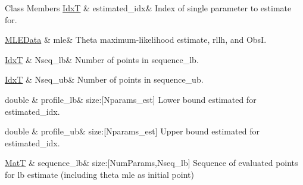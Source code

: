 \begin{DoxyFields}{Class Members}
\hyperlink{namespacemappel_ab17ec0f30b61ece292439d7ece81d3a8}{IdxT}\hypertarget{namespacemappel_1_1estimator_aae656c5dcf7ceedd1a35dcb0163446c0}{}\label{namespacemappel_1_1estimator_aae656c5dcf7ceedd1a35dcb0163446c0}
&
estimated\+\_\+idx&
Index of single parameter to estimate for. \\
\hline

\hyperlink{namespacemappel_1_1estimator_structmappel_1_1estimator_1_1MLEData}{M\+L\+E\+Data}\hypertarget{namespacemappel_1_1estimator_a78f5375e6d29abb17573d1089af37b41}{}\label{namespacemappel_1_1estimator_a78f5375e6d29abb17573d1089af37b41}
&
mle&
Theta maximum-\/likelihood estimate, rllh, and ObsI. \\
\hline

\hyperlink{namespacemappel_ab17ec0f30b61ece292439d7ece81d3a8}{IdxT}\hypertarget{namespacemappel_1_1estimator_a6182fae879fca8e9b8b931215663c9b6}{}\label{namespacemappel_1_1estimator_a6182fae879fca8e9b8b931215663c9b6}
&
Nseq\+\_\+lb&
Number of points in sequence\+\_\+lb. \\
\hline

\hyperlink{namespacemappel_ab17ec0f30b61ece292439d7ece81d3a8}{IdxT}\hypertarget{namespacemappel_1_1estimator_a09d2bfc282a0586c3984a461959f9c21}{}\label{namespacemappel_1_1estimator_a09d2bfc282a0586c3984a461959f9c21}
&
Nseq\+\_\+ub&
Number of points in sequence\+\_\+ub. \\
\hline

double\hypertarget{namespacemappel_1_1estimator_aaa7b7e1fc33c0b4c8ae4cc841c8bb80c}{}\label{namespacemappel_1_1estimator_aaa7b7e1fc33c0b4c8ae4cc841c8bb80c}
&
profile\+\_\+lb&
size\+:\mbox{[}Nparams\+\_\+est\mbox{]} Lower bound estimated for estimated\+\_\+idx. \\
\hline

double\hypertarget{namespacemappel_1_1estimator_a8b5ba18fc88bfe59ee0ae0b77198fc5f}{}\label{namespacemappel_1_1estimator_a8b5ba18fc88bfe59ee0ae0b77198fc5f}
&
profile\+\_\+ub&
size\+:\mbox{[}Nparams\+\_\+est\mbox{]} Upper bound estimated for estimated\+\_\+idx. \\
\hline

\hyperlink{namespacemappel_a7091ab87c528041f7e2027195fad8915}{MatT}\hypertarget{namespacemappel_1_1estimator_a23115e11954d82b571430eb8e15281f2}{}\label{namespacemappel_1_1estimator_a23115e11954d82b571430eb8e15281f2}
&
sequence\+\_\+lb&
size\+:\mbox{[}Num\+Params,Nseq\+\_\+lb\mbox{]} Sequence of evaluated points for lb estimate (including theta mle as initial point) \\
\hline


\end{DoxyFields}
